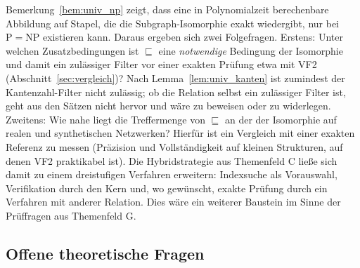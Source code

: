 \documentclass[a4paper,12pt, twoside]{report}
\theoremstyle{definition}
\begin{document}
Bemerkung~\ref{bem:univ_np} zeigt, dass eine in Polynomialzeit berechenbare Abbildung auf Stapel, die die Subgraph-Isomorphie exakt wiedergibt, nur bei $\mathrm{P}=\mathrm{NP}$ existieren kann. Daraus ergeben sich zwei Folgefragen. Erstens: Unter welchen Zusatzbedingungen ist $\sqsubseteq$ eine \emph{notwendige} Bedingung der Isomorphie und damit ein zulässiger Filter vor einer exakten Prüfung etwa mit VF2 (Abschnitt~\ref{sec:vergleich})? Nach Lemma~\ref{lem:univ_kanten} ist zumindest der Kantenzahl-Filter nicht zulässig; ob die Relation selbst ein zulässiger Filter ist, geht aus den Sätzen nicht hervor und wäre zu beweisen oder zu widerlegen. Zweitens: Wie nahe liegt die Treffermenge von $\sqsubseteq$ an der der Isomorphie auf realen und synthetischen Netzwerken? Hierfür ist ein Vergleich mit einer exakten Referenz zu messen (Präzision und Vollständigkeit auf kleinen Strukturen, auf denen VF2 praktikabel ist). Die Hybridstrategie aus Themenfeld C ließe sich damit zu einem dreistufigen Verfahren erweitern: Indexsuche als Vorauswahl, Verifikation durch den Kern und, wo gewünscht, exakte Prüfung durch ein Verfahren mit anderer Relation. Dies wäre ein weiterer Baustein im Sinne der Prüffragen aus Themenfeld G.

\subsection{Offene theoretische Fragen}
\label{sec:ausb_univ_theorie}
\end{document}
